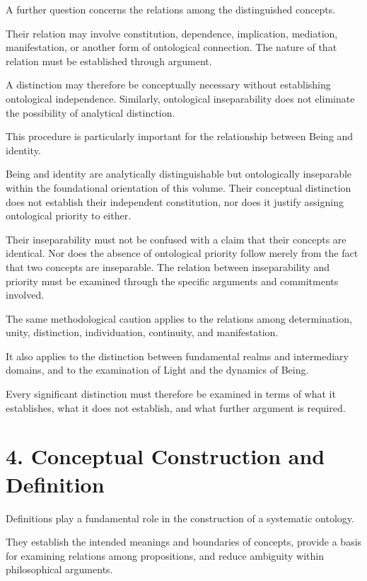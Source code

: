 A further question concerns the relations
among the distinguished concepts.

Their relation may involve constitution,
dependence, implication, mediation,
manifestation, or another form of
ontological connection. The nature
of that relation must be established
through argument.

A distinction may therefore be conceptually
necessary without establishing ontological
independence. Similarly, ontological
inseparability does not eliminate the
possibility of analytical distinction.

This procedure is particularly important
for the relationship between Being and identity.

Being and identity are analytically
distinguishable but ontologically
inseparable within the foundational
orientation of this volume. Their conceptual
distinction does not establish their
independent constitution, nor does it
justify assigning ontological priority
to either.

Their inseparability must not be confused
with a claim that their concepts are
identical. Nor does the absence of
ontological priority follow merely
from the fact that two concepts are
inseparable. The relation between
inseparability and priority must be
examined through the specific arguments
and commitments involved.

The same methodological caution applies
to the relations among determination,
unity, distinction, individuation,
continuity, and manifestation.

It also applies to the distinction between
fundamental realms and intermediary domains,
and to the examination of Light and
the dynamics of Being.

Every significant distinction must therefore
be examined in terms of what it establishes,
what it does not establish, and what
further argument is required.


\section*{4. Conceptual Construction and Definition}

Definitions play a fundamental role in
the construction of a systematic ontology.

They establish the intended meanings
and boundaries of concepts, provide
a basis for examining relations among
propositions, and reduce ambiguity
within philosophical arguments.

